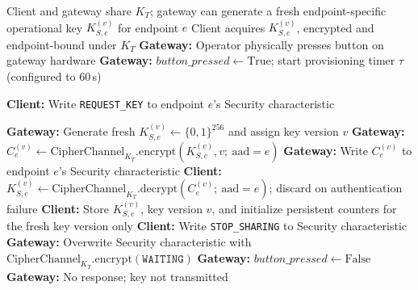 \documentclass[journal]{IEEEtran}
\begin{document}
\begin{algorithm}[!t]
\caption{CipherChannel Key Exchange Protocol}
\label{alg:keyex}
\footnotesize
\begin{algorithmic}[1]
\Require Client and gateway share $K_T$; gateway can generate a fresh endpoint-specific operational key $K_{S,e}^{(v)}$ for endpoint $e$
\Ensure  Client acquires $K_{S,e}^{(v)}$, encrypted and endpoint-bound under $K_T$
\State \textbf{Gateway:} Operator physically presses button on gateway hardware
\State \textbf{Gateway:} $\mathit{button\_pressed} \leftarrow \text{True}$;
       start provisioning timer $\tau$ (configured to 60\,s)

\State \textbf{Client:} Write \texttt{REQUEST\_KEY} to endpoint $e$'s Security characteristic

  \State \textbf{Gateway:} Generate fresh \(K_{S,e}^{(v)} \leftarrow \{0,1\}^{256}\) and assign key version \(v\)
  \State \textbf{Gateway:} \(C_e^{(v)} \leftarrow
       \text{CipherChannel}_{K_T}.\text{encrypt}(K_{S,e}^{(v)}, v;\ \mathrm{aad}=e)\)
  \State \textbf{Gateway:} Write \(C_e^{(v)}\) to endpoint \(e\)'s Security characteristic
  \State \textbf{Client:} \(K_{S,e}^{(v)} \leftarrow
         \text{CipherChannel}_{K_T}.\text{decrypt}(C_e^{(v)};\ \mathrm{aad}=e)\);
         discard on authentication failure
  \State \textbf{Client:} Store \(K_{S,e}^{(v)}\), key version \(v\), and initialize persistent counters for the fresh key version only
  \State \textbf{Client:} Write \texttt{STOP\_SHARING} to Security characteristic
  \State \textbf{Gateway:} Overwrite Security characteristic with
         $\text{CipherChannel}_{K_T}.\text{encrypt}(\texttt{WAITING})$
  \State \textbf{Gateway:} $\mathit{button\_pressed} \leftarrow \text{False}$
\Else
  \State \textbf{Gateway:} No response; key not transmitted
\EndIf
\end{algorithmic}
\end{algorithm}

\end{document}
